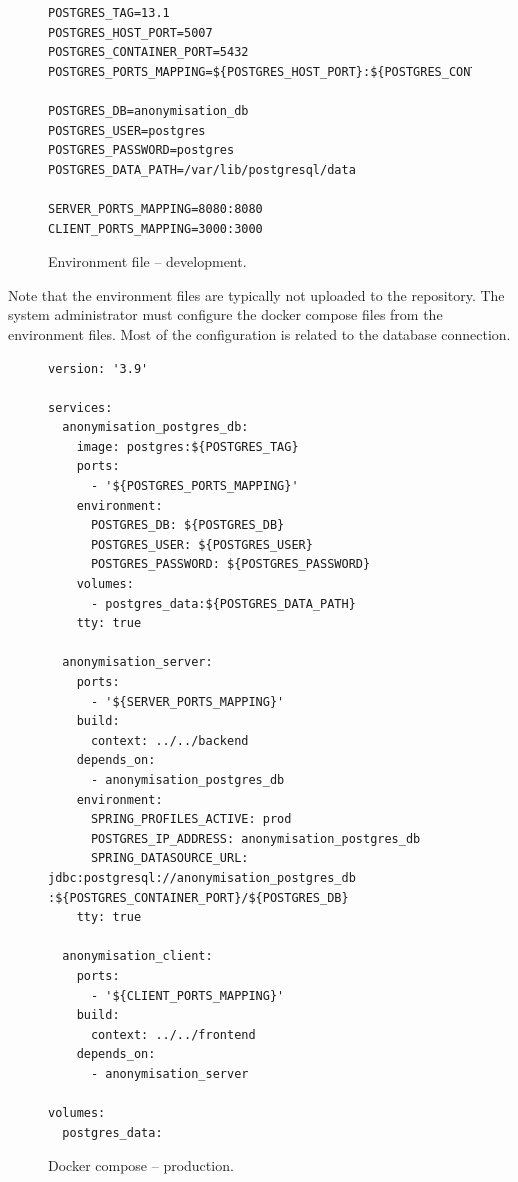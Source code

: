 \documentclass[a4paper,twoside,12pt]{book}
\begin{document}
\begin{figure}[H]
\begin{verbatim}
POSTGRES_TAG=13.1
POSTGRES_HOST_PORT=5007
POSTGRES_CONTAINER_PORT=5432
POSTGRES_PORTS_MAPPING=${POSTGRES_HOST_PORT}:${POSTGRES_CONTAINER_PORT}

POSTGRES_DB=anonymisation_db
POSTGRES_USER=postgres
POSTGRES_PASSWORD=postgres
POSTGRES_DATA_PATH=/var/lib/postgresql/data

SERVER_PORTS_MAPPING=8080:8080
CLIENT_PORTS_MAPPING=3000:3000
\end{verbatim}
\caption{Environment file – development.}
\label{fig:code:environment_production}
\end{figure}

Note that the environment files are typically not uploaded to the repository. The system administrator must configure the docker compose files from the environment files. Most of the configuration is related to the database connection.

\begin{figure}[h]
\begin{verbatim}
version: '3.9'

services:
  anonymisation_postgres_db:
    image: postgres:${POSTGRES_TAG}
    ports:
      - '${POSTGRES_PORTS_MAPPING}'
    environment:
      POSTGRES_DB: ${POSTGRES_DB}
      POSTGRES_USER: ${POSTGRES_USER}
      POSTGRES_PASSWORD: ${POSTGRES_PASSWORD}
    volumes:
      - postgres_data:${POSTGRES_DATA_PATH}
    tty: true

  anonymisation_server:
    ports:
      - '${SERVER_PORTS_MAPPING}'
    build:
      context: ../../backend
    depends_on:
      - anonymisation_postgres_db
    environment:
      SPRING_PROFILES_ACTIVE: prod
      POSTGRES_IP_ADDRESS: anonymisation_postgres_db
      SPRING_DATASOURCE_URL: jdbc:postgresql://anonymisation_postgres_db :${POSTGRES_CONTAINER_PORT}/${POSTGRES_DB}
    tty: true

  anonymisation_client:
    ports:
      - '${CLIENT_PORTS_MAPPING}'
    build:
      context: ../../frontend
    depends_on:
      - anonymisation_server

volumes:
  postgres_data:
\end{verbatim}
\caption{Docker compose – production.}
\label{fig:code:docker_compose_production}
\end{figure}
\end{document}

